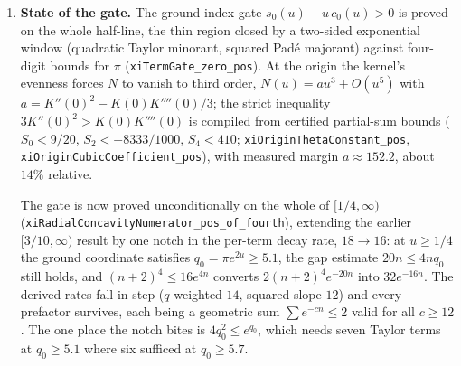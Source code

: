 \documentclass[11pt]{article}
\theoremstyle{plain}
\theoremstyle{definition}
\theoremstyle{remark}
\begin{document}
\begin{enumerate}
We record two dead ends here so they are not re-walked.  Enlarging the
Andreief determinant $\det\bigl[\int u^{2(i-1)}H^{\,j-1}w\bigr]$ instead of
shifting the weight is the wrong generalisation: it forces $H^{j}$-moments
with $j\ge2$, which are Fisher-information functionals and do not reduce by
parts (a natural candidate misses by $6$--$9\%$); and it mismatches degrees,
being degree $d$ in the moments where the Jensen discriminant at degree $d$ is
degree $2(d-1)$, the two agreeing only at $d=2$.  Second, the family $C_j$
consists of Laguerre--Tur\'an inequalities at every index; these are
\emph{necessary} for $\Xi$ to lie in the Laguerre--P\'olya class but not
sufficient, so the uniformity here is uniformity across indices, not a route
to hyperbolicity of $J^{d,0}$ for all $d$.

\item \textbf{State of the gate.}  The ground-index gate
$s_0(u)-u\,c_0(u)>0$ is proved on the whole half-line, the thin region
closed by a two-sided exponential window (quadratic Taylor minorant, squared
Pad\'e majorant) against four-digit bounds for $\pi$
(\texttt{xiTermGate\_zero\_pos}).  At the origin the kernel's evenness forces
$N$ to vanish to third order, $N(u)=au^3+O(u^5)$ with
$a=K''(0)^2-K(0)K''''(0)/3$; the strict inequality $3K''(0)^2>K(0)K''''(0)$
is compiled from certified partial-sum bounds
($S_0<9/20$, $S_2<-8333/1000$, $S_4<410$;
\texttt{xiOriginThetaConstant\_pos}, \texttt{xiOriginCubicCoefficient\_pos}),
with measured margin $a\approx152.2$, about $14\%$ relative.

The gate is now proved unconditionally on the whole of $[1/4,\infty)$
(\texttt{xiRadialConcavityNumerator\_pos\_of\_fourth}), extending the earlier
$[3/10,\infty)$ result by one notch in the per-term decay rate, $18\to16$: at
$u\ge1/4$ the ground coordinate satisfies $q_0=\pi e^{2u}\ge5.1$, the gap
estimate $20n\le 4n q_0$ still holds, and $(n+2)^4\le16e^{4n}$ converts
$2(n+2)^4e^{-20n}$ into $32e^{-16n}$.  The derived rates fall in step
($q$-weighted $14$, squared-slope $12$) and every prefactor survives, each
being a geometric sum $\sum e^{-cn}\le2$ valid for all $c\ge12$.  The one
place the notch bites is $4q_0^2\le e^{q_0}$, which needs seven Taylor terms
at $q_0\ge5.1$ where six sufficed at $q_0\ge5.7$.


\end{enumerate}
\end{document}
